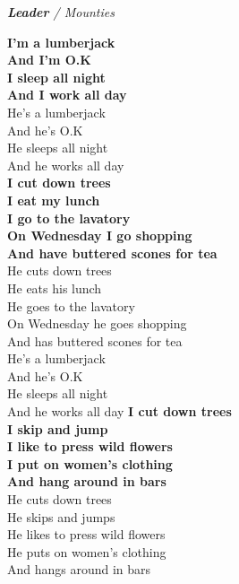 \documentclass[a6paper, 10pt, twoside]{article}
\begin{document}
\begin{center}
\small\textit{\textbf{Leader} / Mounties}
\end{center}
\begin{lyrics}
\small 
\textbf{I'm a lumberjack\\ 
And I'm O.K\\ 
I sleep all night\\ 
And I work all day}
\vspace{5pt}\\ 
He's a lumberjack\\ 
And he's O.K\\ 
He sleeps all night\\ 
And he works all day
\vspace{5pt}\\
\textbf{I cut down trees\\ 
I eat my lunch\\ 
I go to the lavatory\\ 
On Wednesday I go shopping\\ 
And have buttered scones for tea}
\vspace{5pt}\\ 
He cuts down trees\\ 
He eats his lunch\\ 
He goes to the lavatory\\ 
On Wednesday he goes shopping\\ 
And has buttered scones for tea 
\vspace{5pt}\\
He's a lumberjack\\ 
And he's O.K\\ 
He sleeps all night\\
And he works all day
\newpage
\textbf{I cut down trees\\ 
I skip and jump\\ 
I like to press wild flowers\\ 
I put on women's clothing\\ 
And hang around in bars}
\vspace{5pt}\\ 
He cuts down trees\\ 
He skips and jumps\\ 
He likes to press wild flowers\\ 
He puts on women's clothing\\ 
And hangs around in bars
\vspace{5pt}\\ 

\end{lyrics}
\end{document}

